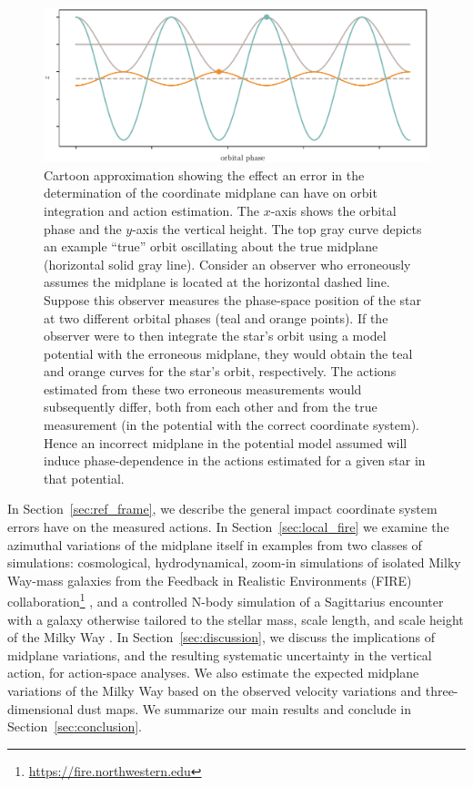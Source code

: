 \documentclass[twocolumn]{aastex62}
\begin{document}
\begin{figure}[ht!]
\begin{center}
\includegraphics[width=\textwidth]{fig/cartoon.pdf}
\end{center}
\caption{Cartoon approximation showing the effect an error in the determination
of the coordinate midplane can have on orbit integration and action estimation.
The $x$-axis shows the orbital phase and the $y$-axis the vertical height. The
top gray curve depicts an example ``true'' orbit oscillating about the true
midplane (horizontal solid gray line). Consider an observer who erroneously
assumes the midplane is located at the horizontal dashed line. Suppose this
observer measures the phase-space position of the star at two different orbital
phases (teal and orange points). If the observer were to then integrate the
star's orbit using a model potential with the erroneous midplane, they would
obtain the teal and orange curves for the star's orbit, respectively. The
actions estimated from these two erroneous measurements would subsequently
differ, both from each other and from the true measurement (in the potential
with the correct coordinate system). Hence an incorrect midplane in the
potential model assumed will induce phase-dependence in the actions estimated
for a given star in that potential.} \label{fig:cartoon} \end{figure}

In Section~\ref{sec:ref_frame}, we describe the general impact coordinate system
errors have on the measured actions. In Section~\ref{sec:local_fire} we examine
the azimuthal variations of the midplane itself in examples from two classes of
simulations: cosmological, hydrodynamical, zoom-in simulations of isolated Milky
Way-mass galaxies from the Feedback in Realistic Environments (FIRE)
collaboration\footnote{\url{https://fire.northwestern.edu}}
\citep{2014MNRAS.445..581H, 2016ApJ...827L..23W, 2018MNRAS.480..800H}, and a
controlled N-body simulation of a Sagittarius encounter with a galaxy otherwise
tailored to the stellar mass, scale length, and scale height of the Milky Way
\citep{2018MNRAS.481..286L}. In Section~\ref{sec:discussion}, we discuss the
implications of midplane variations, and the resulting systematic uncertainty in
the vertical action, for action-space analyses. We also estimate the expected
midplane variations of the Milky Way based on the observed velocity variations
and three-dimensional dust maps. We summarize our main results and conclude in
Section~\ref{sec:conclusion}.
\end{document}
